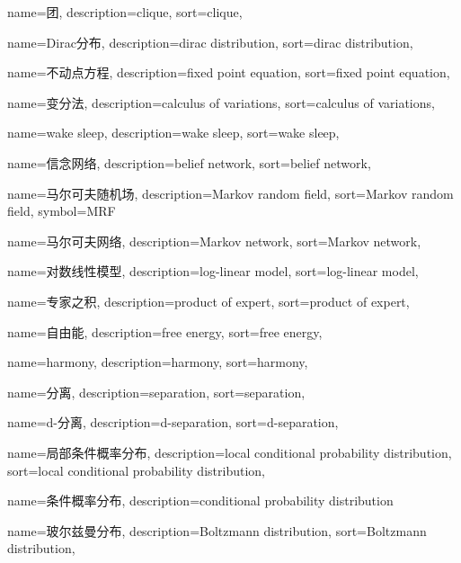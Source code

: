 {
  name=团,
  description={clique},
  sort={clique},
}

{
  name=Dirac分布,
  description={dirac distribution},
  sort={dirac distribution},
}

{
  name=不动点方程,
  description={fixed point equation},
  sort={fixed point equation},
}

{
  name=变分法,
  description={calculus of variations},
  sort={calculus of variations},
}

{
  name=wake sleep,
  description={wake sleep},
  sort={wake sleep},
}

{
  name=信念网络,
  description={belief network},
  sort={belief network},
}

{
  name=马尔可夫随机场,
  description={Markov random field},
  sort={Markov random field},
  symbol={MRF}
}

{
  name=马尔可夫网络,
  description={Markov network},
  sort={Markov network},
}

{
  name=对数线性模型,
  description={log-linear model},
  sort={log-linear model},
}

{
  name=专家之积,
  description={product of expert},
  sort={product of expert},
}

{
  name=自由能,
  description={free energy},
  sort={free energy},
}

{
  name=harmony,
  description={harmony},
  sort={harmony},
}

{
  name=分离,
  description={separation},
  sort={separation},
}

{
  name=d-分离,
  description={d-separation},
  sort={d-separation},
}

{
  name=局部条件概率分布,
  description={local conditional probability distribution},
  sort={local conditional probability distribution},
}

{
  name=条件概率分布,
  description={conditional probability distribution}
}

{
  name=玻尔兹曼分布,
  description={Boltzmann distribution},
  sort={Boltzmann distribution},
}

